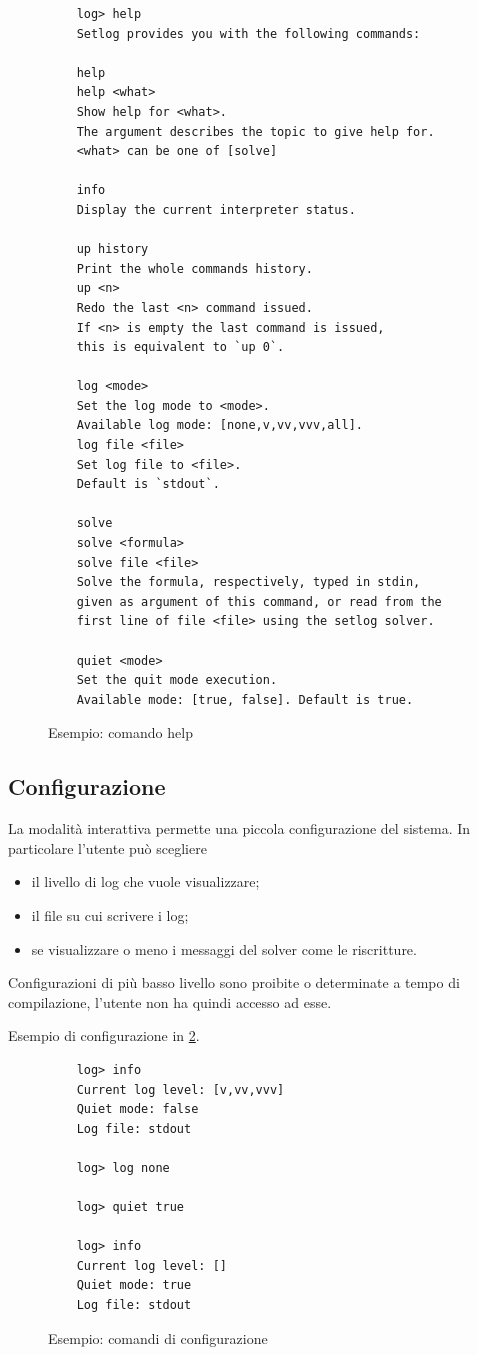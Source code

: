 \documentclass[12pt,a4paper,openright]{book} %
\begin{document}
\begin{figure}
	\begin{verbatim}
	log> help
	Setlog provides you with the following commands:
	
	help
	help <what>
	Show help for <what>.
	The argument describes the topic to give help for.
	<what> can be one of [solve]
	
	info
	Display the current interpreter status.
	
	up history
	Print the whole commands history.
	up <n>
	Redo the last <n> command issued.
	If <n> is empty the last command is issued,
	this is equivalent to `up 0`.
	
	log <mode>
	Set the log mode to <mode>.
	Available log mode: [none,v,vv,vvv,all].
	log file <file>
	Set log file to <file>.
	Default is `stdout`.
	
	solve
	solve <formula>
	solve file <file>
	Solve the formula, respectively, typed in stdin,
	given as argument of this command, or read from the
	first line of file <file> using the setlog solver.
	
	quiet <mode>
	Set the quit mode execution.
	Available mode: [true, false]. Default is true.
	\end{verbatim}
	
	\caption{Esempio: comando help}
	\label{fig:example_helpcommand}
\end{figure}

\subsection{Configurazione}

La modalità interattiva permette una piccola configurazione del sistema. In particolare l'utente può scegliere 
\begin{itemize}
	\item il livello di log che vuole visualizzare;
	\item il file su cui scrivere i log;
	\item se visualizzare o meno i messaggi del solver come le riscritture.
\end{itemize}

Configurazioni di più basso livello sono proibite o determinate a tempo di compilazione, l'utente non ha quindi accesso ad esse.

Esempio di configurazione in \ref{fig:example_confcommands}.

\begin{figure}
	\begin{verbatim}
	log> info
	Current log level: [v,vv,vvv]
	Quiet mode: false
	Log file: stdout
	
	log> log none
	
	log> quiet true
	
	log> info
	Current log level: []
	Quiet mode: true
	Log file: stdout
	\end{verbatim}
	\caption{Esempio: comandi di configurazione}
	\label{fig:example_confcommands}
\end{figure}
\end{document}
